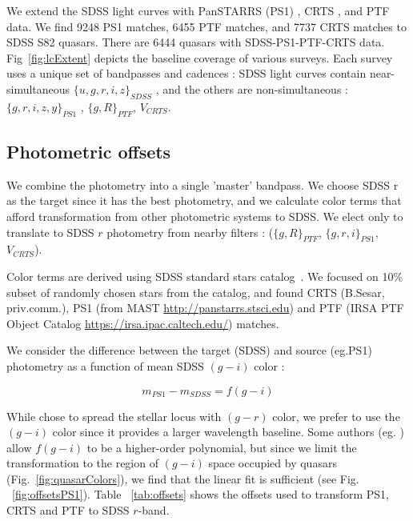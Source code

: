 \documentclass[twocolumn]{aastex62}
\begin{document}
We extend the SDSS  light curves with PanSTARRS (PS1) \citep{chambers2011,flewelling2018}, CRTS \citep{drake2009}, and PTF \citep{rau2009} data. We find 9248 PS1 matches, 6455 PTF matches, and 7737 CRTS matches to SDSS S82 quasars. There are  6444 quasars with SDSS-PS1-PTF-CRTS data.  Fig~\ref{fig:lcExtent}  depicts the  baseline coverage of various surveys.  Each survey uses a unique set of bandpasses and cadences : SDSS light curves contain near-simultaneous $\{u,g,r,i,z\}_{SDSS}$ , and the others are  non-simultaneous : $\{g,r,i,z,y\}_{PS1}$ ,  $\{g,R\}_{PTF}$, $V_{CRTS}$.  

\subsection{Photometric offsets}

We combine the photometry into a single 'master' bandpass. We choose SDSS r as the target since it has the best photometry, and we calculate color terms that afford transformation from other photometric systems to SDSS. We elect only to translate to SDSS $r$ photometry from nearby filters : ($\{g,R\}_{PTF}$, $\{g,r,i\}_{PS1}$, $V_{CRTS}$). 

Color terms are derived using SDSS standard stars catalog~\citep{ivezic2007}.  We focused on 10\% subset of randomly chosen stars from the catalog, and found CRTS (B.Sesar, priv.comm.), PS1 (from MAST \url{http://panstarrs.stsci.edu}) and PTF (IRSA PTF Object Catalog \url{https://irsa.ipac.caltech.edu/}) matches. 

We consider the difference  between the target (SDSS) and source (eg.PS1) photometry as a function of mean SDSS $(g-i)$ color : 


\begin{equation}
m_{PS1} - m_{SDSS} = f(g-i)
\end{equation}

While \cite{tonry2012} chose to spread the stellar locus with $(g-r)$ color, we prefer to use the $(g-i)$ color since it provides a larger wavelength baseline. Some authors (eg. \citet{li2018}) allow $f(g-i)$ to be a higher-order polynomial, but since we limit the transformation to the  region of $(g-i)$ space occupied by quasars (Fig.~\ref{fig:quasarColors}), we find that the linear fit is sufficient (see Fig. ~\ref{fig:offsetsPS1}).   Table ~\ref{tab:offsets} shows the offsets used to transform PS1, CRTS and PTF to SDSS $r$-band. 


\begin{figure*}
\caption{Regions occupied in color-color space by S82 quasars (colors) and standard stars (contours) 	\citep{schneider2010}. We show only 10 000  randomly chosen stars from the  full 1 mln + standard stars catalog \citealt{ivezic2007}. We limit the offset to  SDSS $-0.5<(g-i)<1.$. Quasars also overlap other variable sources (eg. RRLyrae), not shown on this illustration \citealt{sesar2007}. }
\label{fig:quasarColors}
\end{figure*} 
\end{document}
